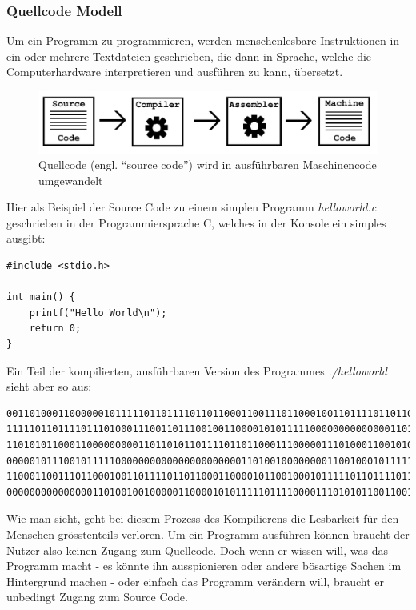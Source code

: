 \documentclass[a4paper,11pt]{article}
\begin{document}
\subsubsection{Quellcode Modell}
Um ein Programm zu programmieren, werden menschenlesbare Instruktionen in ein oder mehrere Textdateien geschrieben,
die dann in Sprache, welche die Computerhardware interpretieren und ausführen zu kann, übersetzt.

\begin{figure}[H]
    \centering
    \includegraphics[width=.8\textwidth]{media/Source2Executable.jpg}
    \caption{Quellcode (engl. ``source code'') wird in ausführbaren Maschinencode umgewandelt \cite{stallman2002}}
\end{figure}

Hier als Beispiel der Source Code zu einem simplen Programm \textit{helloworld.c} geschrieben in der Programmiersprache C, welches in der Konsole ein simples  ausgibt:

\lstset{language=C}
\begin{lstlisting}
#include <stdio.h>

int main() {
    printf("Hello World\n");
    return 0;
}
\end{lstlisting}
Ein Teil der kompilierten, ausführbaren Version des Programmes \textit{./helloworld} sieht aber so aus:
\begin{lstlisting}
0011010001100000010111110110111101101100011001110110001001101111011011000110000101100100010
1111101101111011101000111001101110010011000010101111100000000000000110100011100000111100001
1101010110001100000000011011010110111101101100011100000111010001100101011001000110010100110
0000010111001011111000000000000000000000011010010000000011001000101111101011111011011110110
1100011001110110001001101111011011000110000101100100010111110110111101110100011100110111001
0000000000000001101001001000001100001010111110111100001110101011001100101111101101110011010
\end{lstlisting}

Wie man sieht, geht bei diesem Prozess des Kompilierens die Lesbarkeit für den Menschen grösstenteils verloren. Um ein Programm ausführen können braucht der Nutzer also keinen Zugang zum Quellcode. Doch wenn er wissen will, was das Programm macht - es könnte ihn ausspionieren oder andere bösartige Sachen im Hintergrund machen - oder einfach das Programm verändern will, braucht er unbedingt Zugang zum Source Code.\\
\end{document}
